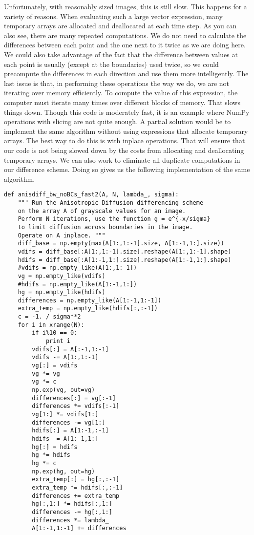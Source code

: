 Unfortunately, with reasonably sized images, this is still slow.
This happens for a variety of reasons.
When evaluating such a large vector expression, many temporary arrays are allocated and deallocated at each time step.
As you can also see, there are many repeated computations.
We do not need to calculate the differences between each point and the one next to it twice as we are doing here.
We could also take advantage of the fact that the difference between values at each point is usually (except at the boundaries) used twice, so we could precompute the differences in each direction and use them more intelligently.
The last issue is that, in performing these operations the way we do, we are not iterating over memory efficiently.
To compute the value of this expression, the computer must iterate many times over different blocks of memory.
That slows things down.
Though this code is moderately fast, it is an example where NumPy operations with slicing are not quite enough.
A partial solution would be to implement the same algorithm without using expressions that allocate temporary arrays.
The best way to do this is with inplace operations.
That will ensure that our code is not being slowed down by the costs from allocating and deallocating temporary arrays.
We can also work to eliminate all duplicate computations in our difference scheme.
Doing so gives us the following implementation of the same algorithm.
\begin{lstlisting}
def anisdiff_bw_noBCs_fast2(A, N, lambda_, sigma):
    """ Run the Anisotropic Diffusion differencing scheme
    on the array A of grayscale values for an image.
    Perform N iterations, use the function g = e^{-x/sigma}
    to limit diffusion across boundaries in the image.
    Operate on A inplace. """
    diff_base = np.empty(max(A[1:,1:-1].size, A[1:-1,1:].size))
    vdifs = diff_base[:A[1:,1:-1].size].reshape(A[1:,1:-1].shape)
    hdifs = diff_base[:A[1:-1,1:].size].reshape(A[1:-1,1:].shape)
    #vdifs = np.empty_like(A[1:,1:-1])
    vg = np.empty_like(vdifs)
    #hdifs = np.empty_like(A[1:-1,1:])
    hg = np.empty_like(hdifs)
    differences = np.empty_like(A[1:-1,1:-1])
    extra_temp = np.empty_like(hdifs[:,:-1])
    c = -1. / sigma**2
    for i in xrange(N):
        if i%10 == 0:
            print i
        vdifs[:] = A[:-1,1:-1]
        vdifs -= A[1:,1:-1]
        vg[:] = vdifs
        vg *= vg
        vg *= c
        np.exp(vg, out=vg)
        differences[:] = vg[:-1]
        differences *= vdifs[:-1]
        vg[1:] *= vdifs[1:]
        differences -= vg[1:]
        hdifs[:] = A[1:-1,:-1]
        hdifs -= A[1:-1,1:]
        hg[:] = hdifs
        hg *= hdifs
        hg *= c
        np.exp(hg, out=hg)
        extra_temp[:] = hg[:,:-1]
        extra_temp *= hdifs[:,:-1]
        differences += extra_temp
        hg[:,1:] *= hdifs[:,1:]
        differences -= hg[:,1:]
        differences *= lambda_
        A[1:-1,1:-1] += differences
\end{lstlisting}
